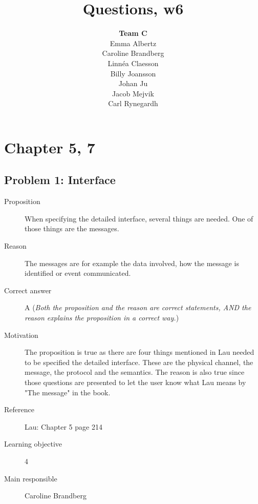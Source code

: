 \documentclass[10pt,a4paper]{article}
\title{Questions, w6}
\author{\textbf{Team C}\\
Emma Albertz\\
Caroline Brandberg\\
Linnéa Claesson\\
Billy Joansson\\
Johan Ju\\
Jacob Mejvik\\
Carl Rynegardh}
\begin{document}
\maketitle
\section*{Chapter 5, 7}
\subsection*{Problem 1: Interface}
\begin{description}
\item[Proposition] When specifying the detailed interface, several things are needed. One of those things are the messages. 
\item[Reason] The messages are for example the data involved, how the message is identified or event communicated.  
\item[Correct answer] A (\textit{Both the proposition and the reason are correct statements,
AND the reason explains the proposition in a correct way.})
\item[Motivation]  The proposition is true as there are four things mentioned in Lau needed to be specified the detailed interface. These are the physical channel, the message, the protocol and the semantics. The reason is also true since those questions are presented to let the user know what Lau means by "The message" in the book.
\item[Reference] Lau: Chapter 5 page 214
\item[Learning objective] 4 
\item[Main responsible] Caroline Brandberg
\end{description} 

\end{document}
